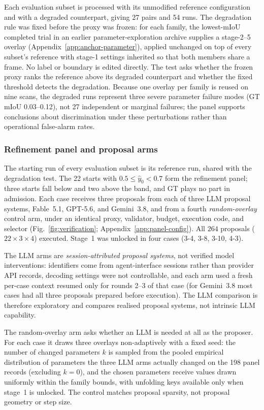 \documentclass[a4paper,fleqn]{cas-dc}
\begin{document}
Each evaluation subset is processed with its unmodified reference configuration and with a degraded counterpart, giving 27 pairs and 54 runs. The degradation rule was fixed before the proxy was frozen: for each family, the lowest-mIoU completed trial in an earlier parameter-exploration archive supplies a stage-2--5 overlay (Appendix~\ref{app:anchor-parameter}), applied unchanged on top of every subset's reference with stage-1 settings inherited so that both members share a frame. No label or boundary is edited directly. The test asks whether the frozen proxy ranks the reference above its degraded counterpart and whether the fixed threshold detects the degradation. Because one overlay per family is reused on nine scans, the degraded runs represent three severe parameter failure modes (GT mIoU 0.03--0.12), not 27 independent or marginal failures; the panel supports conclusions about discrimination under these perturbations rather than operational false-alarm rates.

\subsubsection{Refinement panel and proposal arms}
\label{sec:poc-protocol}

The starting run of every evaluation subset is its reference run, shared with the degradation test. The 22 starts with $0.5\le\hat y_0<0.7$ form the refinement panel; three starts fall below and two above the band, and GT plays no part in admission. Each case receives three proposals from each of three LLM proposal systems, Fable~5.1, GPT-5.6, and Gemini~3.8, and from a fourth \emph{random-overlay} control arm, under an identical proxy, validator, budget, execution code, and selector (Fig.~\ref{fig:verification}; Appendix~\ref{app:panel-config}). All $264$ proposals ($22\times3\times4$) executed. Stage~1 was unlocked in four cases (3-4, 3-8, 3-10, 4-3).

The LLM arms are \emph{session-attributed proposal systems}, not verified model interventions: identifiers come from agent-interface sessions rather than provider API records, decoding settings were not controllable, and each arm used a fresh per-case context resumed only for rounds 2--3 of that case (for Gemini~3.8 most cases had all three proposals prepared before execution). The LLM comparison is therefore exploratory and compares realised proposal systems, not intrinsic LLM capability.

The random-overlay arm asks whether an LLM is needed at all as the proposer. For each case it draws three overlays non-adaptively with a fixed seed: the number of changed parameters $k$ is sampled from the pooled empirical distribution of parameters the three LLM arms actually changed on the 198 panel records (excluding $k=0$), and the chosen parameters receive values drawn uniformly within the family bounds, with unfolding keys available only when stage~1 is unlocked. The control matches proposal sparsity, not proposal geometry or step size.
\end{document}
